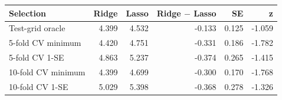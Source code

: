 \begin{center}
\small
\setlength{\tabcolsep}{4pt}
\begin{tabular}{lrrrrr}
\toprule
Selection & Ridge & Lasso & Ridge $-$ Lasso & SE & z \\
\midrule
Test-grid oracle & 4.399 & 4.532 & -0.133 & 0.125 & -1.059 \\
5-fold CV minimum & 4.420 & 4.751 & -0.331 & 0.186 & -1.782 \\
5-fold CV 1-SE & 4.863 & 5.237 & -0.374 & 0.265 & -1.415 \\
10-fold CV minimum & 4.399 & 4.699 & -0.300 & 0.170 & -1.768 \\
10-fold CV 1-SE & 5.029 & 5.398 & -0.368 & 0.278 & -1.326 \\
\bottomrule
\end{tabular}
\end{center}
